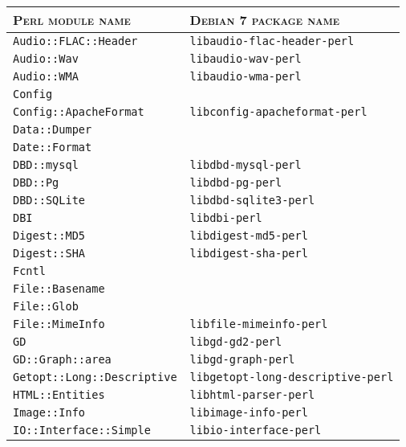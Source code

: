 \begin{table}
	\centering
	\begin{tabular}{|p{15em}|p{18em}|}
		\hline
		\textsc{Perl module name} 						& \textsc{Debian 7 package name} \\
		\hline
		\hline
		\verb|Audio::FLAC::Header| 						& \verb|libaudio-flac-header-perl| \\
		\hline
		\verb|Audio::Wav| 										& \verb|libaudio-wav-perl| \\
		\hline
		\verb|Audio::WMA| 										& \verb|libaudio-wma-perl| \\
		\hline
		\verb|Config| 												& \\
		\hline
		\verb|Config::ApacheFormat|						& \verb|libconfig-apacheformat-perl| \\
		\hline
		\verb|Data::Dumper| 									& \\
		\hline
		\verb|Date::Format| 									& \\
		\hline
		\verb|DBD::mysql|											& \verb|libdbd-mysql-perl| \\
		\hline
		\verb|DBD::Pg|												& \verb|libdbd-pg-perl| \\
		\hline
		\verb|DBD::SQLite|										& \verb|libdbd-sqlite3-perl| \\
		\hline
		\verb|DBI|														& \verb|libdbi-perl| \\
		\hline
		\verb|Digest::MD5| 										& \verb|libdigest-md5-perl| \\
		\hline
		\verb|Digest::SHA| 										& \verb|libdigest-sha-perl| \\
		\hline
		\verb|Fcntl| 													& \\
		\hline
		\verb|File::Basename| 								& \\
		\hline
		\verb|File::Glob| 										& \\
		\hline
		\verb|File::MimeInfo| 								& \verb|libfile-mimeinfo-perl| \\
		\hline
		\verb|GD| 														& \verb|libgd-gd2-perl| \\
		\hline
		\verb|GD::Graph::area| 								& \verb|libgd-graph-perl| \\
		\hline
		\verb|Getopt::Long::Descriptive| 			& \verb|libgetopt-long-descriptive-perl| \\
		\hline
		\verb|HTML::Entities|									& \verb|libhtml-parser-perl| \\
		\hline
		\verb|Image::Info| 										& \verb|libimage-info-perl| \\
		\hline
		\verb|IO::Interface::Simple| 					& \verb|libio-interface-perl| \\

\end{tabular}
\end{table}
